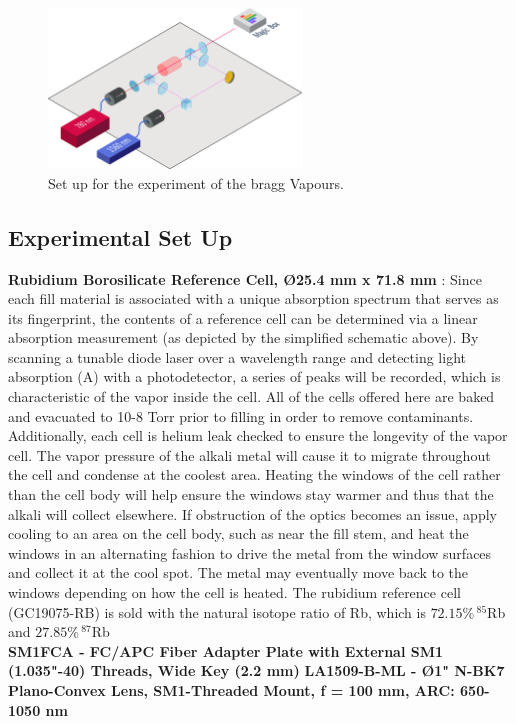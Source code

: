 \documentclass[10pt]{article}
\begin{document}
\begin{figure}
    \centering
    \includegraphics[width=0.6\textwidth]{img/path16176.png}
    \caption{Set up for the experiment of the bragg Vapours.}
    \label{fig:braggref1}
\end{figure}






\subsection*{Experimental Set Up}
\textbf{Rubidium Borosilicate Reference Cell, Ø25.4 mm x 71.8 mm } :
Since each fill material is associated with a unique absorption spectrum that serves as its fingerprint, the contents of a reference cell can be determined via a linear absorption measurement (as depicted by the simplified schematic above). By scanning a tunable diode laser over a wavelength range and detecting light absorption (A) with a photodetector, a series of peaks will be recorded, which is characteristic of the vapor inside the cell.
All of the cells offered here are baked and evacuated to 10-8 Torr prior to filling in order to remove contaminants. Additionally, each cell is helium leak checked to ensure the longevity of the vapor cell. The vapor pressure of the alkali metal will cause it to migrate throughout the cell and condense at the coolest area. Heating the windows of the cell rather than the cell body will help ensure the windows stay warmer and thus that the alkali will collect elsewhere. If obstruction of the optics becomes an issue, apply cooling to an area on the cell body, such as near the fill stem, and heat the windows in an alternating fashion to drive the metal from the window surfaces and collect it at the cool spot. The metal may eventually move back to the windows depending on how the cell is heated.
The rubidium reference cell (GC19075-RB) is sold with the natural isotope ratio of Rb, which is $72.15\% \, ^{85}$Rb and $27.85\% \, ^{87}$Rb  \\
\textbf{SM1FCA - FC/APC Fiber Adapter Plate with External SM1 (1.035"-40) Threads, Wide Key (2.2 mm)}
\textbf{LA1509-B-ML - Ø1" N-BK7 Plano-Convex Lens, SM1-Threaded Mount, f = 100 mm, ARC: 650-1050 nm }
\end{document}
